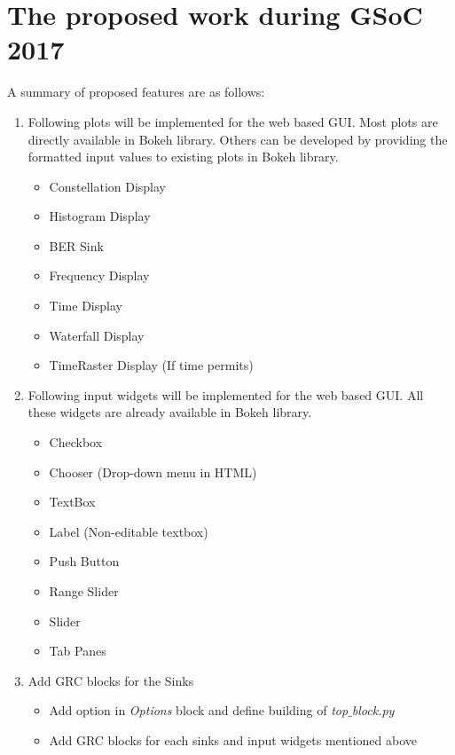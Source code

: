 \documentclass[a4paper, 11pt]{article}
\begin{document}
\section{The proposed work during GSoC 2017}
A summary of proposed features are as follows:

\begin{enumerate}
\item Following plots will be implemented for the web based GUI. Most plots are directly available in Bokeh library. Others can be developed by providing the formatted input values to existing plots in Bokeh library.

\begin{itemize}
\item Constellation Display
\item Histogram Display
\item BER Sink
\item Frequency Display
\item Time Display
\item Waterfall Display
\item TimeRaster Display (If time permits)
\end{itemize}

\item Following input widgets will be implemented for the web based GUI. All these widgets are already available in Bokeh library.
\begin{itemize}
\item Checkbox
\item Chooser (Drop-down menu in HTML)
\item TextBox
\item Label (Non-editable textbox)
\item Push Button
\item Range Slider
\item Slider
\item Tab Panes
\end{itemize}

\item Add GRC blocks for the Sinks
\begin{itemize}
\item Add option in \textit{Options} block and define building of \textit{top$\_$block.py}
\item Add GRC blocks for each sinks and input widgets mentioned above
\end{itemize}

\end{enumerate}
\end{document}

